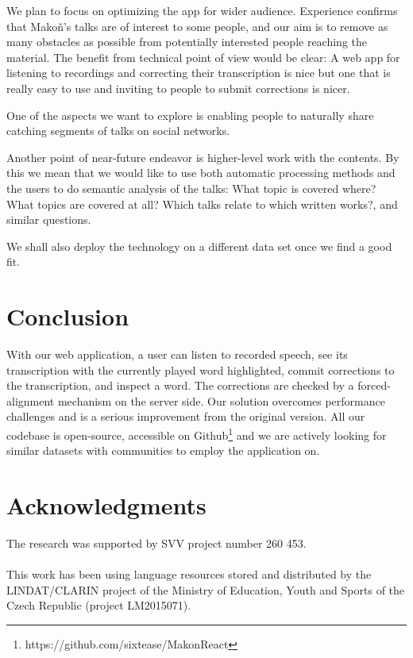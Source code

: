 \documentclass{svproc}
\begin{document}
We plan to focus on optimizing the app for wider audience. Experience confirms
that Mako\v{n}'s talks are of interest to some people, and our aim is to
remove as many obstacles as possible from potentially interested people reaching
the material. The benefit from technical point of view would be clear: A web app
for listening to recordings and correcting their transcription is nice but one
that is really easy to use and inviting to people to submit corrections is nicer.

One of the aspects we want to explore is enabling people to naturally share
catching segments of talks on social networks.

Another point of near-future endeavor is higher-level work with the contents. By
this we mean that we would like to use both automatic processing methods and the
users to do semantic analysis of the talks: What topic is covered where? What
topics are covered at all? Which talks relate to which written works?, and
similar questions.

We shall also deploy the technology on a different data set once we find a good
fit.

\section{Conclusion}

With our web application, a user can listen to recorded speech, see its
transcription with the currently played word highlighted, commit corrections to
the transcription, and inspect a word. The corrections are checked by a
forced-alignment mechanism on the server side. Our solution overcomes
performance challenges and is a serious improvement from the original version.
All our codebase is open-source, accessible on
Github\footnote{https://github.com/sixtease/MakonReact} and we are actively
looking for similar datasets with communities to employ the application on.

\section*{Acknowledgments}

The research was supported by SVV project number 260 453.\\
\\
This work has been using language resources stored
and distributed  by the LINDAT/CLARIN project of the Ministry of Education,
Youth and Sports of the Czech Republic (project LM2015071).



\end{document}
